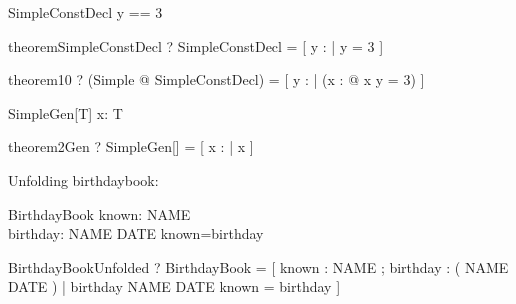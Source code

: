 \begin{schema}{SimpleConstDecl}
  y == 3
\end{schema}

\begin{theorem}{theoremSimpleConstDecl}
  \vdash? SimpleConstDecl =
    [ y : \arithmos | y = 3 ]
\end{theorem}

\begin{theorem}{theorem10}
  \vdash? (\exists Simple @ SimpleConstDecl) =
    [ y : \arithmos | 
      (\exists x : \arithmos @ x \in \nat \land y = 3) ]
\end{theorem}


\begin{schema}{SimpleGen}[T]
  x: T
\end{schema}

\begin{theorem}{theorem2Gen}
  \vdash? SimpleGen[\nat] =
    [ x : \arithmos | x \in \nat ]
\end{theorem}




Unfolding birthdaybook:

\begin{zed}\end{zed}

\begin{schema}{BirthdayBook}
    known: \power NAME \\
    birthday: NAME \pfun DATE
\where
    known=\dom birthday
\end{schema}

\begin{theorem}{BirthdayBookUnfolded}
  \vdash? BirthdayBook =
    [ known : \power NAME ; birthday : \power ( NAME \cross DATE )
    | birthday \in NAME \pfun DATE \land known = \dom birthday ]
\end{theorem}
